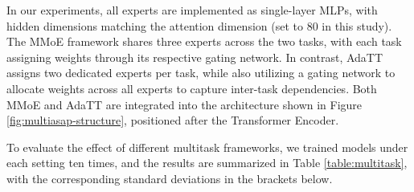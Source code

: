 \documentclass[preprint,12pt]{elsarticle}
\begin{document}
In our experiments, all experts are implemented as single-layer MLPs, with hidden dimensions matching the attention dimension (set to 80 in this study). The MMoE framework shares three experts across the two tasks, with each task assigning weights through its respective gating network. In contrast, AdaTT assigns two dedicated experts per task, while also utilizing a gating network to allocate weights across all experts to capture inter-task dependencies. Both MMoE and AdaTT are integrated into the architecture shown in Figure \ref{fig:multiasap-structure}, positioned after the Transformer Encoder.

To evaluate the effect of different multitask frameworks, we trained models under each setting ten times, and the results are summarized in Table \ref{table:multitask}, with the corresponding standard deviations in the brackets below. 



\end{document}
